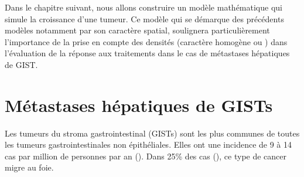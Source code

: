 \documentclass[main.tex]{subfiles}
\begin{document}
Dans le chapitre suivant, nous allons construire un modèle mathématique qui simule la croissance d'une tumeur. Ce modèle qui se démarque des précédents modèles notamment par son caractère spatial, soulignera particulièrement l'importance de la prise en compte des densités (caractère homogène ou \heterogene) dans l'évaluation de la réponse aux traitements dans le cas de métastases hépatiques de GIST.

\section{Métastases hépatiques de GISTs}
Les tumeurs du stroma gastrointestinal (GISTs) sont les plus communes de toutes les tumeurs 
gastrointestinales non épithéliales. Elles ont une incidence de 9 à 14 cas par million de personnes par an (\cf \cite{Nilsson2005}). 
Dans 25\% des cas (\cf \cite{dematteo2000}), ce type 
de cancer migre au foie. 
\end{document}
